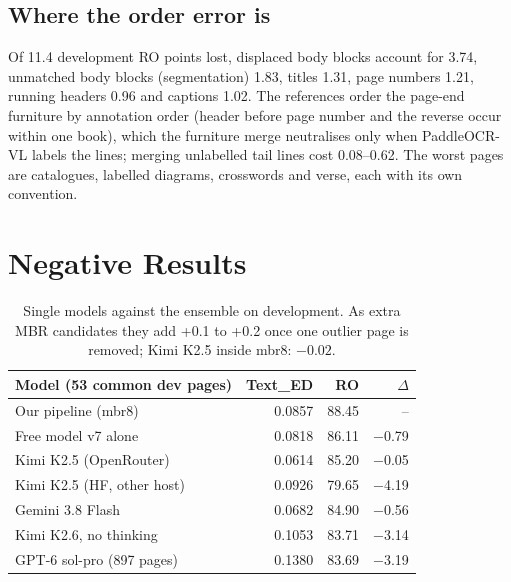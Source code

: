 \documentclass[11pt]{article}
\newcommand{\ted}{Text\_ED}
\newcommand{\ro}{RO}
\begin{document}
\subsection{Where the order error is}
Of 11.4 development \ro{} points lost, displaced body blocks account for 3.74, unmatched body blocks (segmentation) 1.83, titles 1.31, page numbers 1.21, running headers 0.96 and captions 1.02. The references order the page-end furniture by annotation order (header before page number and the reverse occur within one book), which the furniture merge neutralises only when PaddleOCR-VL labels the lines; merging unlabelled tail lines cost 0.08--0.62. The worst pages are catalogues, labelled diagrams, crosswords and verse, each with its own convention.

\section{Negative Results}
\label{sec:negative}

\begin{table}[t]
\centering\small
\setlength{\tabcolsep}{3pt}
\begin{tabular}{lrrr}
\toprule
Model (53 common dev pages) & \ted & \ro & $\Delta$ \\
\midrule
Our pipeline (mbr8) & 0.0857 & 88.45 & -- \\
Free model v7 alone & 0.0818 & 86.11 & $-$0.79 \\
Kimi K2.5 (OpenRouter) & 0.0614 & 85.20 & $-$0.05 \\
Kimi K2.5 (HF, other host) & 0.0926 & 79.65 & $-$4.19 \\
Gemini 3.8 Flash & 0.0682 & 84.90 & $-$0.56 \\
Kimi K2.6, no thinking & 0.1053 & 83.71 & $-$3.14 \\
\midrule
GPT-6 sol-pro (897 pages) & 0.1380 & 83.69 & $-$3.19 \\
\bottomrule
\end{tabular}
\caption{Single models against the ensemble on development. As extra MBR candidates they add +0.1 to +0.2 once one outlier page is removed; Kimi K2.5 inside mbr8: $-0.02$.}
\label{tab:models}
\end{table}
\end{document}
